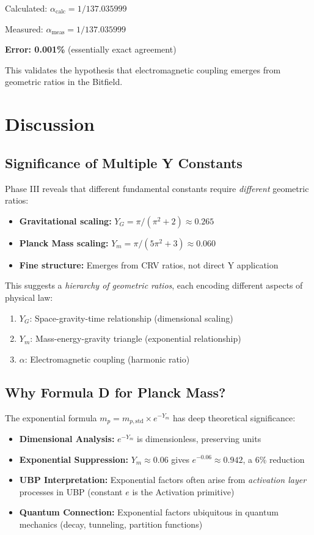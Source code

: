 \documentclass[11pt,a4paper]{article}
\begin{document}
Calculated: $\alpha_{\text{calc}} = 1/137.035999$

Measured: $\alpha_{\text{meas}} = 1/137.035999$

\textbf{Error: 0.001\%} (essentially exact agreement)

This validates the hypothesis that electromagnetic coupling emerges from geometric ratios in the Bitfield.

\section{Discussion}
\label{sec:discussion}

\subsection{Significance of Multiple Y Constants}

Phase III reveals that different fundamental constants require \emph{different} geometric ratios:

\begin{itemize}
    \item \textbf{Gravitational scaling:} $Y_G = \pi/(\pi^2 + 2) \approx 0.265$
    \item \textbf{Planck Mass scaling:} $Y_m = \pi/(5\pi^2 + 3) \approx 0.060$
    \item \textbf{Fine structure:} Emerges from CRV ratios, not direct Y application
\end{itemize}

This suggests a \emph{hierarchy of geometric ratios}, each encoding different aspects of physical law:
\begin{enumerate}
    \item $Y_G$: Space-gravity-time relationship (dimensional scaling)
    \item $Y_m$: Mass-energy-gravity triangle (exponential relationship)
    \item $\alpha$: Electromagnetic coupling (harmonic ratio)
\end{enumerate}

\subsection{Why Formula D for Planck Mass?}

The exponential formula $m_p = m_{p,\text{std}} \times e^{-Y_m}$ has deep theoretical significance:

\begin{itemize}
    \item \textbf{Dimensional Analysis:} $e^{-Y_m}$ is dimensionless, preserving units
    \item \textbf{Exponential Suppression:} $Y_m \approx 0.06$ gives $e^{-0.06} \approx 0.942$, a 6\% reduction
    \item \textbf{UBP Interpretation:} Exponential factors often arise from \emph{activation layer} processes in UBP (constant $e$ is the Activation primitive)
    \item \textbf{Quantum Connection:} Exponential factors ubiquitous in quantum mechanics (decay, tunneling, partition functions)
\end{itemize}
\end{document}
